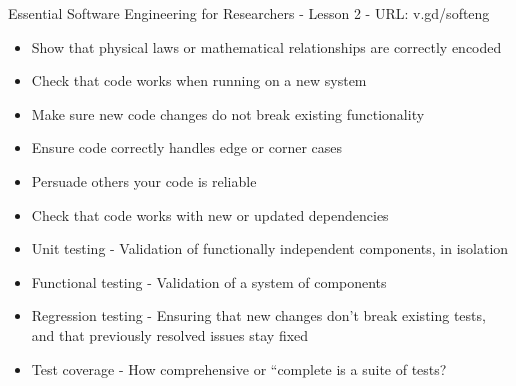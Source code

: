 \documentclass[8pt]{extarticle}
\begin{document}
\thispagestyle{empty}

\begin{center}
  {\LARGE
  Essential Software Engineering for Researchers - Lesson 2 - URL: v.gd/softeng}
\end{center}

\begin{navybox}[title=Why test?]
  \begin{multicols}{2}
    \begin{itemize}
    \itemsep-3pt
    \item Show that physical laws or mathematical relationships are correctly encoded
    \item Check that code works when running on a new system
    \item Make sure new code changes do not break existing functionality
    \item Ensure code correctly handles edge or corner cases
    \item Persuade others your code is reliable
    \item Check that code works with new or updated dependencies
    \end{itemize}
  \end{multicols}
\end{navybox}


\begin{bluebox}[title=Useful terms]
  \begin{itemize}
    \itemsep-3pt
  \item Unit testing - Validation of functionally independent components, in
    isolation
  \item Functional testing - Validation of a system of components
  \item Regression testing - Ensuring that new changes don't break existing
    tests, and that previously resolved issues stay fixed
  \item Test coverage - How comprehensive or ``complete is a suite of tests?
  \end{itemize}
\end{bluebox}
\end{document}

